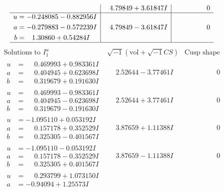 \documentclass[1p]{elsarticle_modified}
\theoremstyle{definition}
\newcommand{\I}{\sqrt{-1}}
\begin{document}
$$\begin{array}{c|c|c}
 & \phantom{-}4.79849 + 3.61847 I & \phantom{-0.000000 } 0 \\ \hline\begin{aligned}
u &= -0.248085 - 0.882956 I \\
a &= -0.279883 - 0.572239 I \\
b &= \phantom{-}1.30860 + 0.54284 I\end{aligned}
 & \phantom{-}4.79849 - 3.61847 I & \phantom{-0.000000 } 0\\
 \hline 
 \end{array}$$\newpage$$\begin{array}{c|c|c}  
\text{Solutions to }I^u_{1}& \I (\text{vol} + \sqrt{-1}CS) & \text{Cusp shape}\\
 \hline 
\begin{aligned}
u &= \phantom{-}0.469993 + 0.983361 I \\
a &= \phantom{-}0.404945 + 0.623698 I \\
b &= \phantom{-}0.319679 + 0.191630 I\end{aligned}
 & \phantom{-}2.52644 - 3.77461 I & \phantom{-0.000000 } 0 \\ \hline\begin{aligned}
u &= \phantom{-}0.469993 - 0.983361 I \\
a &= \phantom{-}0.404945 - 0.623698 I \\
b &= \phantom{-}0.319679 - 0.191630 I\end{aligned}
 & \phantom{-}2.52644 + 3.77461 I & \phantom{-0.000000 } 0 \\ \hline\begin{aligned}
u &= -1.095110 + 0.053192 I \\
a &= \phantom{-}0.157178 + 0.352529 I \\
b &= \phantom{-}0.325305 - 0.401567 I\end{aligned}
 & \phantom{-}3.87659 + 1.11388 I & \phantom{-0.000000 } 0 \\ \hline\begin{aligned}
u &= -1.095110 - 0.053192 I \\
a &= \phantom{-}0.157178 - 0.352529 I \\
b &= \phantom{-}0.325305 + 0.401567 I\end{aligned}
 & \phantom{-}3.87659 - 1.11388 I & \phantom{-0.000000 } 0 \\ \hline\begin{aligned}
u &= \phantom{-}0.293799 + 1.073150 I \\
a &= -0.94094 + 1.25573 I \\

\end{aligned}
\end{array}$$
\end{document}
